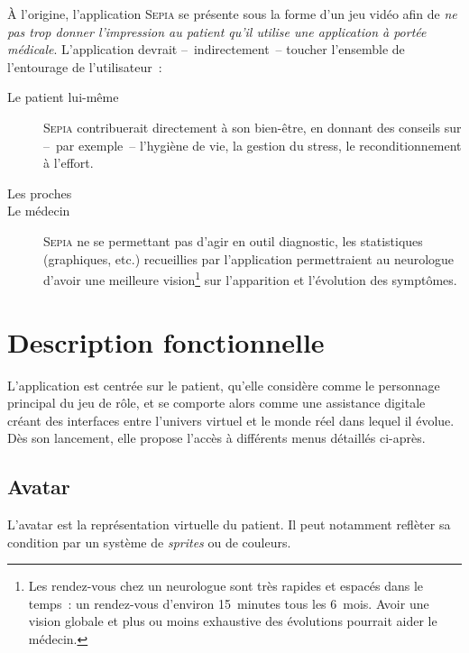 \documentclass[a4paper,12pt,francais]{article}
\newcommand{\Sepia}{\textsc{Sepia}\xspace}
\begin{document}
À l’origine, l’application \Sepia{} se présente sous la forme d’un jeu vidéo afin de \emph{ne pas trop donner l’impression au patient qu’il utilise une application à portée médicale}. L’application devrait –~indirectement~– toucher l’ensemble de l’entourage de l’utilisateur~:
\begin{description}
    \item[Le patient lui-même] \Sepia{} contribuerait directement à son bien-être, en donnant des conseils sur –~par exemple~– l’hygiène de vie, la gestion du stress, le reconditionnement à l’effort.
    \item[Les proches] %
    \item[Le médecin] \Sepia{} ne se permettant pas d’agir en outil diagnostic, les statistiques (graphiques, etc.) recueillies par l’application permettraient au neurologue d’avoir une meilleure vision\footnote{Les rendez-vous chez un neurologue sont très rapides et espacés dans le temps~: un rendez-vous d’environ 15~minutes tous les 6~mois. Avoir une vision globale et plus ou moins exhaustive des évolutions pourrait aider le médecin.} sur l’apparition et l’évolution des symptômes.
\end{description}

\section{Description fonctionnelle}
L'application est centrée sur le patient, qu'elle considère comme le personnage principal du jeu de rôle, et se comporte alors comme une assistance digitale créant des interfaces entre l'univers virtuel et le monde réel dans lequel il évolue. Dès son lancement, elle propose l'accès à différents menus détaillés ci-après.
\subsection{Avatar}
L'avatar est la représentation virtuelle du patient. Il peut notamment reflèter sa condition par un système de \textit{sprites} ou de couleurs.
\end{document}
